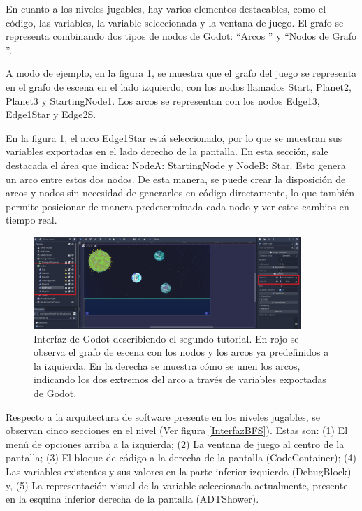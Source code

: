 En cuanto a los niveles jugables, hay varios elementos destacables, como el código, las variables, la variable seleccionada y la ventana de juego. El grafo se representa combinando dos tipos de nodos de Godot: ``Arcos '' y ``Nodos de Grafo ''.

A modo de ejemplo, en la figura \ref{SecondTutorialGraph}, se muestra que el grafo del juego se representa en el grafo de escena en el lado izquierdo, con los nodos llamados Start, Planet2, Planet3 y StartingNode1. Los arcos se representan con los nodos Edge13, Edge1Star y Edge2S.

En la figura \ref{SecondTutorialGraph}, el arco Edge1Star está seleccionado, por lo que se muestran sus variables exportadas en el lado derecho de la pantalla. En esta sección, sale destacada el área que indica: NodeA: StartingNode y NodeB: Star. Esto genera un arco entre estos dos nodos. De esta manera, se puede crear la disposición de arcos y nodos sin necesidad de generarlos en código directamente, lo que también permite posicionar de manera predeterminada cada nodo y ver estos cambios en tiempo real.

\begin{figure}[h]
	\centering
	\includegraphics[width=0.9\textwidth]{imagenes/SecondTutorialGraph.png}
	\caption{Interfaz de Godot describiendo el segundo tutorial. En rojo se observa el grafo de escena con los nodos y los arcos ya predefinidos a la izquierda. En la derecha se muestra cómo se unen los arcos, indicando los dos extremos del arco a través de variables exportadas de Godot.}
	\label{SecondTutorialGraph}
\end{figure}


Respecto a la arquitectura de software presente en los niveles jugables, se observan cinco secciones en el nivel (Ver figura \ref{InterfazBFS}). Estas son: (1) El menú de opciones arriba a la izquierda; (2) La ventana de juego al centro de la pantalla; (3) El bloque de código a la derecha de la pantalla (CodeContainer); (4) Las variables existentes y sus valores en la parte inferior izquierda (DebugBlock) y, (5) La representación visual de la variable seleccionada actualmente, presente en la esquina inferior derecha de la pantalla (ADTShower).

